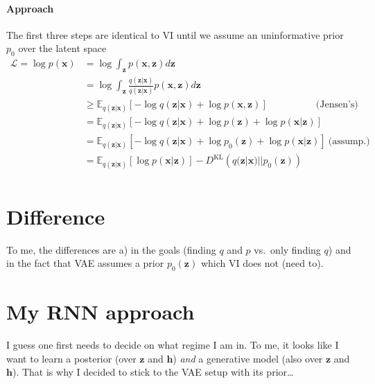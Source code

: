 \documentclass[a4paper,10pt]{article}
\newcommand\h{\mathbf h}
\newcommand\x{\mathbf x}
\newcommand\z{\mathbf z}
\newcommand\E{\mathbb E}
\newcommand\DKL[2]{D^\text{KL}\!\left(#1||#2\right)}
\begin{document}
\paragraph{Approach}
The first three steps are identical to VI until we assume an uninformative prior $p_0$ over the latent space
\begin{align}
\mathcal L=\log p(\x)&=\log\int_\z p(\x,\z)d\z\\
	&=\log\int_\z \frac{q(\z|\x)}{q(\z|\x)}p(\x,\z)d\z\\
	&\geq\E_{q(\z|\x)}[-\log q(\z|\x) + \log p(\x,\z)]\qquad\qquad\quad\text{(Jensen's)}\\
	&=\E_{q(\z|\x)}[-\log q(\z|\x) + \log p(\z) + \log p(\x|\z)]\\
	&=\E_{q(\z|\x)}[-\log q(\z|\x) + \log p_0(\z) + \log p(\x|\z)]\ \text{(assump.)}\\
	&=\E_{q(\z|\x)}[\log p(\x|\z)] - \DKL{q(\z|\x)}{p_0(\z)}\\	
\end{align}
\section{Difference}
To me, the differences are a) in the goals (finding $q$ and $p$ vs.\ only finding $q$) and in the fact that VAE assumes a prior $p_0(\z)$ which VI does not (need to).
\section{My RNN approach}
I guess one first needs to decide on what regime I am in. To me, it looks like I want to learn a posterior (over $\z$ and $\h$) \emph{and} a generative model (also over $\z$ and $\h$). That is why I decided to stick to the VAE setup with its prior\dots 
\end{document}
